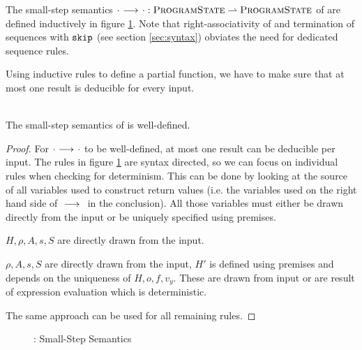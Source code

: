 The small-step semantics ${\cdot} \,\,{\longrightarrow^{}}\,\, {\cdot} : \textup{\textsc{ProgramState}} \rightharpoonup \textup{\textsc{ProgramState}}$ of \svlidf are defined inductively in figure \ref{fig:svl-sem-dyn-sstep}.
Note that right-associativity of \ttt{;} and termination of sequences with $\textup{\texttt{skip}}$ (see section \ref{sec:syntax}) obviates the need for dedicated sequence rules.

Using inductive rules to define a partial function, we have to make sure that at most one result is deducible for every input.
\begin{lemma}
    \label{lemma:ss-wd}~\\
    The small-step semantics of \svlidf is well-defined.
\end{lemma}
\begin{proof}
    For ${\cdot} \,\,{\longrightarrow^{}}\,\, {\cdot}$ to be well-defined, at most one result can be deducible per input.
    The rules in figure \ref{fig:svl-sem-dyn-sstep} are syntax directed, so we can focus on individual rules when checking for determinism.
    This can be done by looking at the source of all variables used to construct return values (i.e. the variables used on the right hand side of ${} \,\,{\longrightarrow^{}}\,\, {}$ in the conclusion).
    All those variables must either be drawn directly from the input or be uniquely specified using premises.
    
    $H, \rho, A, s, S$ are directly drawn from the input.
    
    $\rho, A, s, S$ are directly drawn from the input, $H'$ is defined using premises and depends on the uniqueness of $H, o, f, v_y$.
    These are drawn from input or are result of expression evaluation which is deterministic.
    
    The same approach can be used for all remaining rules.
\end{proof}

\begin{figure}
    \boxed{\sstep{\pi}{\pi}}
    
    \caption{\svlidf: Small-Step Semantics}
    \label{fig:svl-sem-dyn-sstep}
\end{figure}


